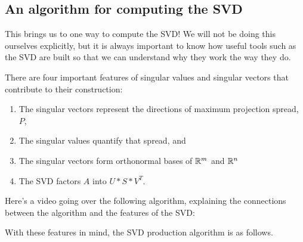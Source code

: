 \documentclass{ximera}
\begin{document}
\subsection*{An algorithm for computing the SVD}

This brings us to one way to compute the SVD! We will not be doing this ourselves explicitly, but it is always important to know how useful tools such as the SVD are built so that we can understand why they work the way they do. 

There are four important features of singular values and singular vectors that contribute to their construction: \begin{enumerate}
  \item The singular vectors represent the directions of maximum projection spread, $P$,
  \item The singular values quantify that spread, and 
  \item The singular vectors form orthonormal bases of $\mathbb{R}^m$ and $\mathbb{R}^n$
  \item The SVD factors $A$ into $U*S*V^T$.
\end{enumerate}

Here's a video going over the following algorithm, explaining the connections between the algorithm and the features of the SVD:

\begin{center}
\end{center}

With these features in mind, the SVD production algorithm is as follows.
\end{document}
